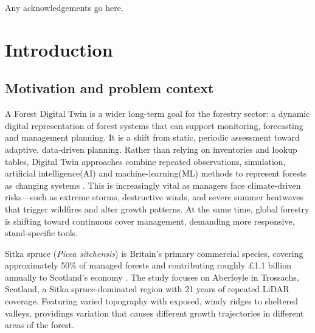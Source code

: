 \documentclass[logo,msc,ai]{infthesis}           %
\begin{document}
\begin{preliminary}
\begin{ethics}
\standarddeclaration
\end{ethics}


\begin{acknowledgements}
Any acknowledgements go here.
\end{acknowledgements}


\tableofcontents
\end{preliminary}

\chapter{Introduction} \label{chap:introduction}
\section{Motivation and problem context}
A Forest Digital Twin is a wider long-term goal for the forestry sector: a dynamic digital representation of forest systems that can support monitoring, forecasting and management planning. It is a shift from static, periodic assessment toward adaptive, data-driven planning. Rather than relying on inventories and lookup tables, Digital Twin approaches combine repeated observations, simulation, artificial intelligence(AI) and machine-learning(ML) methods to represent forests as changing systems \cite{baskent2026Review_C1_SS, buonocore2022Proposal_C1_SS}. This is increasingly vital as managers face climate-driven risks—such as extreme storms, destructive winds, and severe summer heatwaves that trigger wildfires and alter growth patterns. At the same time, global forestry is shifting toward continuous cover management, demanding more responsive, stand-specific tools.\cite{ForestResearch2009Evidence_C1_SS}

Sitka spruce (\textit{Picea sitchensis}) is Britain's primary commercial species, covering approximately 50\% of managed forests \cite{ForestResearch2026Sitka_C1_SS} and contributing roughly \pounds1.1 billion annually to Scotland's economy \cite{ScottishForestry2026Future_C1_SS, mason2011Sitka_C1_SS}. The study focuses on Aberfoyle in Trossachs, Scotland, a Sitka spruce-dominated region with 21 years of repeated LiDAR coverage. Featuring varied topography with exposed, windy ridges to sheltered valleys, providings variation that causes different growth trajectories in different areas of the forest. 
\end{document}
